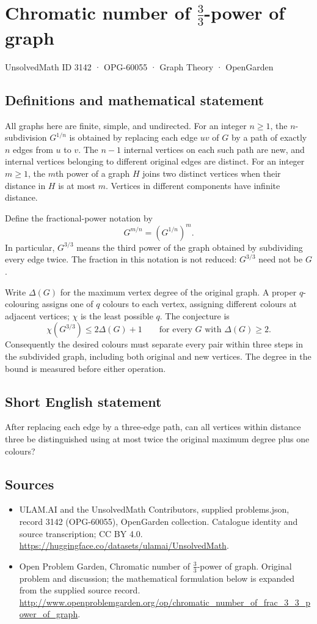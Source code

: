 \documentclass[11pt,a4paper]{article}
\begin{document}
\section*{Chromatic number of $\frac{3}{3}$-power of graph}\label{3142}
{\small UnsolvedMath ID 3142 · OPG-60055 · Graph Theory · OpenGarden}
\subsection{Definitions and mathematical statement}
All graphs here are finite, simple, and undirected. For an integer
$n\geq1$, the $n$-subdivision $G^{1/n}$ is obtained by replacing
each edge $uv$ of $G$ by a path of exactly $n$ edges from $u$ to
$v$. The $n-1$ internal vertices on each such path are new, and
internal vertices belonging to different original edges are
distinct. For an integer $m\geq1$, the $m$th power of a graph $H$
joins two distinct vertices when their distance in $H$ is at most
$m$. Vertices in different components have infinite distance.

Define the fractional-power notation by
\[
 G^{m/n}=(G^{1/n})^m.
\]
In particular, $G^{3/3}$ means the third power of the graph obtained
by subdividing every edge twice. The fraction in this notation is
not reduced: $G^{3/3}$ need not be $G$.

Write $\Delta(G)$ for the maximum vertex degree of the original
graph. A proper $q$-colouring assigns one of $q$ colours to each
vertex, assigning different colours at adjacent vertices; $\chi$
is the least possible $q$. The conjecture is
\[
 \chi(G^{3/3})\leq2\Delta(G)+1
 \qquad\text{for every }G\text{ with }\Delta(G)\geq2.
\]
Consequently the desired colours must separate every pair within
three steps in the subdivided graph, including both original and
new vertices. The degree in the bound is measured before either
operation.
\subsection{Short English statement}
After replacing each edge by a three-edge path, can all vertices within distance three be distinguished using at most twice the original maximum degree plus one colours?
\subsection{Sources}
\begin{itemize}
\item[S1] ULAM.AI and the UnsolvedMath Contributors, supplied problems.json, record 3142 (OPG-60055), OpenGarden collection. Catalogue identity and source transcription; CC BY 4.0.
\url{https://huggingface.co/datasets/ulamai/UnsolvedMath}.
\item[S2] Open Problem Garden, Chromatic number of $\frac{3}{3}$-power of graph. Original problem and discussion; the mathematical formulation below is expanded from the supplied source record.
\url{http://www.openproblemgarden.org/op/chromatic_number_of_frac_3_3_power_of_graph}.
\end{itemize}
\end{document}
